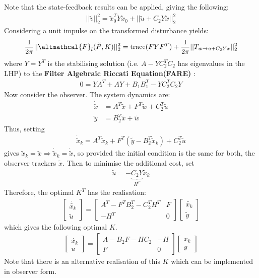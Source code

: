 \documentclass[a4paper]{book}
\newcommand{\ix}[1]{%
  \leavevmode %
  \marginpar{\small\emph{#1}}%
}
\begin{document}
Note that the state-feedback results can be applied, giving the following:
\begin{align}
|| \tilde{v}||_2^2 = \tilde{x}_{0}^T Y \tilde{x}_0 + || \tilde{u} + C_2 Y \tilde{x} ||_2^2
\end{align}
Considering a unit impulse on the transformed disturbance yields:
\begin{align}
\frac{1}{2\pi} || \altmathcal{F}_{l}(\tilde{P}, K) ||_2^2 = \text{trace}(FYF^T) + \frac{1}{2\pi} || T_{\tilde{w} \rightarrow \tilde{u} + C_2 Y \bar{x}} ||_2^2
\end{align}
where $Y = Y^T$ is the stabilising solution (i.e. $A - YC_2^TC_2$ has eigenvalues in the LHP) to the \textbf{Filter Algebraic Riccati Equation(FARE)}\ix{FARE}:\begin{align}
0 = YA^T + AY + B_1 B_1^T - Y C_2^T C_2 Y
\end{align}
Now consider the observer. The system dynamics are:
\begin{align}
\dot{\tilde{x}} &= A^T \tilde{x} + F^T \tilde{w} + C_2^T \tilde{u} \\
\tilde{y} &= B_2^T \tilde{x} + \tilde{w}
\end{align}
Thus, setting
\begin{align}
\dot{\tilde{x}}_k = A^T \tilde{x}_k + F^T (\tilde{y} - B_2^T \tilde{x}_k) + C_2^T \tilde{u}
\end{align}
gives $\tilde{x}_k = \tilde{x} \Rightarrow \dot{\tilde{x}}_k = \dot{\tilde{x}}$, so provided the initial condition is the same for both, the observer trackers $\tilde{x}$. Then to minimise the additional cost, set
\begin{align}
\tilde{u} = -\underbrace{C_2 Y}_{H^T} \tilde{x}_k
\end{align}
Therefore, the optimal $K^T$ has the realisation:
\begin{align}
\begin{bmatrix}
\dot{\tilde{x_k}} \\
\tilde{u}
\end{bmatrix}
= \begin{bmatrix}
A^T - F^T B_2^T - C_2^T H^T & F \\
-H^T & 0
\end{bmatrix}\begin{bmatrix}
\tilde{x_k} \\
\tilde{y}
\end{bmatrix}
\end{align}
which gives the following optimal $K$. 
\begin{align}
\begin{bmatrix}
\dot{x_k} \\
u
\end{bmatrix}
= \begin{bmatrix}
A - B_2 F - HC_2 & -H \\
F & 0
\end{bmatrix}\begin{bmatrix}
x_k \\
y
\end{bmatrix}
\end{align}
Note that there is an alternative realisation of this $K$ which can be implemented in observer form. 
\end{document}
